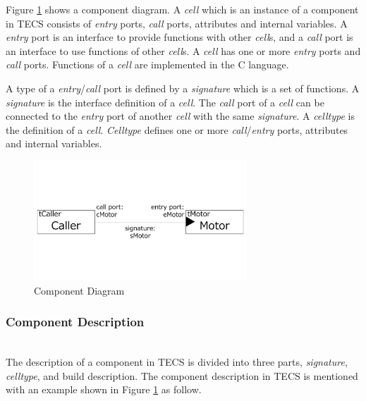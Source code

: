 \documentclass[conference,compsoc]{IEEEtran}
\begin{document}
Figure \ref{fig:component} shows a component diagram.
A {\it cell} which is an instance of a component in TECS consists of {\it entry} ports, {\it call} ports, attributes and internal variables.
A {\it entry} port is an interface to provide functions with other {\it cell}s, and a {\it call} port is an interface to use functions of other {\it cell}s.
A {\it cell} has one or more {\it entry} ports and {\it call} ports.
Functions of a {\it cell} are implemented in the C language.

A type of a {\it entry}/{\it call} port is defined by a {\it signature} which is a set of functions.
A {\it signature} is the interface definition of a {\it cell}.
The {\it call} port of a {\it cell} can be connected to the {\it entry} port of another {\it cell} with the same {\it signature}.
A {\it celltype} is the definition of a {\it cell}.
{\it Celltype} defines one or more {\it call}/{\it entry} ports, attributes and internal variables.

\begin{figure}[t]
    \centering
    \includegraphics[width=8cm,clip]{figure/component_diagram.pdf}
    \caption{Component Diagram}
    \label{fig:component}
\end{figure}

\subsubsection{Component Description}\mbox{}\\

The description of a component in TECS is divided into three parts, {\it signature}, {\it celltype}, and build description.
The component description in TECS is mentioned with an example shown in Figure \ref{fig:component} as follow.
\end{document}
